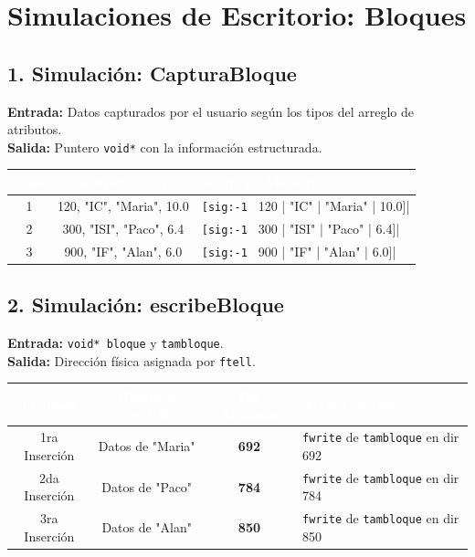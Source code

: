 \documentclass[12pt]{article}
\begin{document}
\clearpage
{}
\section{Simulaciones de Escritorio: Bloques}

{}
\subsection*{1. Simulación: CapturaBloque}
\textbf{Entrada:} Datos capturados por el usuario según los tipos del arreglo de atributos.\\
\textbf{Salida:} Puntero \verb|void*| con la información estructurada.

\begin{table}[H]
\centering
\renewcommand{\arraystretch}{1.05}
\begin{tabular}{|c|c|p{8cm}|}
\hline
\rowcolor{MainBlue}
\textcolor{white}{\textbf{Caso}} & \textcolor{white}{\textbf{Entrada (cin)}} & \textcolor{white}{\textbf{Salida en Memoria}} \\
\hline
1 & 120, "IC", "Maria", 10.0 & \verb|[sig:-1 | 120 | "IC" | "Maria" | 10.0]| \\
\hline
2 & 300, "ISI", "Paco", 6.4 & \verb|[sig:-1 | 300 | "ISI" | "Paco"  |  6.4]| \\
\hline
3 & 900, "IF", "Alan", 6.0 & \verb|[sig:-1 | 900 | "IF" | "Alan"  |  6.0]| \\
\hline
\end{tabular}
\end{table}

{}
\subsection*{2. Simulación: escribeBloque}
\textbf{Entrada:} \verb|void* bloque| y \verb|tambloque|.\\
\textbf{Salida:} Dirección física asignada por \verb|ftell|.

\begin{table}[H]
\centering
\renewcommand{\arraystretch}{1.05}
\begin{tabular}{|c|c|c|p{6cm}|}
\hline
\rowcolor{MainBlue}
\textcolor{white}{\textbf{Llamada}} & \textcolor{white}{\textbf{Bloque a escribir}} & \textcolor{white}{\textbf{Dir Asignada}} & \textcolor{white}{\textbf{Acción en Disco}} \\
\hline
1ra Inserción & Datos de "Maria" & \textbf{692} & \verb|fwrite| de \verb|tambloque| en dir 692 \\
\hline
2da Inserción & Datos de "Paco" & \textbf{784} & \verb|fwrite| de \verb|tambloque| en dir 784 \\
\hline
3ra Inserción & Datos de "Alan" & \textbf{850} & \verb|fwrite| de \verb|tambloque| en dir 850 \\
\hline
\end{tabular}
\end{table}
\end{document}
